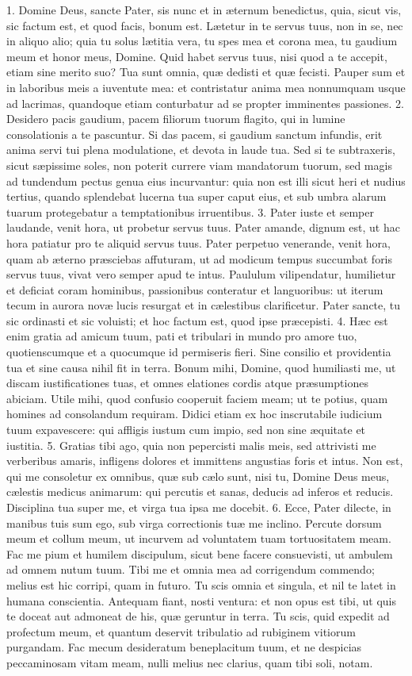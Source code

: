 1. Domine Deus, sancte Pater, sis nunc et in æternum benedictus, quia, sicut vis, sic factum est, et quod facis, bonum est. Lætetur in te servus tuus, non in se, nec in aliquo alio; quia tu solus lætitia vera, tu spes mea et corona mea, tu gaudium meum et honor meus, Domine. Quid habet servus tuus, nisi quod a te accepit, etiam sine merito suo? Tua sunt omnia, quæ dedisti et quæ fecisti. Pauper sum et in laboribus meis a iuventute mea: et contristatur anima mea nonnumquam usque ad lacrimas, quandoque etiam conturbatur ad se propter imminentes passiones.
2. Desidero pacis gaudium, pacem filiorum tuorum flagito, qui in lumine consolationis a te pascuntur. Si das pacem, si gaudium sanctum infundis, erit anima servi tui plena modulatione, et devota in laude tua. Sed si te subtraxeris, sicut sæpissime soles, non poterit currere viam mandatorum tuorum, sed magis ad tundendum pectus genua eius incurvantur: quia non est illi sicut heri et nudius tertius, quando splendebat lucerna tua super caput eius, et sub umbra alarum tuarum protegebatur a temptationibus irruentibus.
3. Pater iuste et semper laudande, venit hora, ut probetur servus tuus. Pater amande, dignum est, ut hac hora patiatur pro te aliquid servus tuus. Pater perpetuo venerande, venit hora, quam ab æterno præsciebas affuturam, ut ad modicum tempus succumbat foris servus tuus, vivat vero semper apud te intus. Paululum vilipendatur, humilietur et deficiat coram hominibus, passionibus conteratur et languoribus: ut iterum tecum in aurora novæ lucis resurgat et in cælestibus clarificetur. Pater sancte, tu sic ordinasti et sic voluisti; et hoc factum est, quod ipse præcepisti.
4. Hæc est enim gratia ad amicum tuum, pati et tribulari in mundo pro amore tuo, quotienscumque et a quocumque id permiseris fieri. Sine consilio et providentia tua et sine causa nihil fit in terra. Bonum mihi, Domine, quod humiliasti me, ut discam iustificationes tuas, et omnes elationes cordis atque præsumptiones abiciam. Utile mihi, quod confusio cooperuit faciem meam; ut te potius, quam homines ad consolandum requiram. Didici etiam ex hoc inscrutabile iudicium tuum expavescere: qui affligis iustum cum impio, sed non sine æquitate et iustitia.
5. Gratias tibi ago, quia non pepercisti malis meis, sed attrivisti me verberibus amaris, infligens dolores et immittens angustias foris et intus. Non est, qui me consoletur ex omnibus, quæ sub cælo sunt, nisi tu, Domine Deus meus, cælestis medicus animarum: qui percutis et sanas, deducis ad inferos et reducis. Disciplina tua super me, et virga tua ipsa me docebit.
6. Ecce, Pater dilecte, in manibus tuis sum ego, sub virga correctionis tuæ me inclino. Percute dorsum meum et collum meum, ut incurvem ad voluntatem tuam tortuositatem meam. Fac me pium et humilem discipulum, sicut bene facere consuevisti, ut ambulem ad omnem nutum tuum. Tibi me et omnia mea ad corrigendum commendo; melius est hic corripi, quam in futuro. Tu scis omnia et singula, et nil te latet in humana conscientia. Antequam fiant, nosti ventura: et non opus est tibi, ut quis te doceat aut admoneat de his, quæ geruntur in terra. Tu scis, quid expedit ad profectum meum, et quantum deservit tribulatio ad rubiginem vitiorum purgandam. Fac mecum desideratum beneplacitum tuum, et ne despicias peccaminosam vitam meam, nulli melius nec clarius, quam tibi soli, notam.
